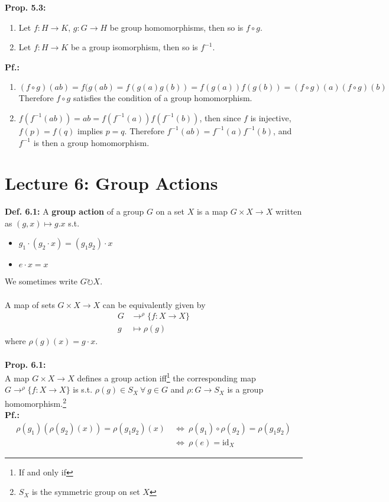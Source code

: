 \documentclass{article}
\begin{document}
\textbf{Prop. 5.3:}\\
\begin{enumerate}
\item Let $f:H\rightarrow K$, $g:G\rightarrow H$ be group homomorphisms, then so is $f\circ g$.
\item Let $f:H\rightarrow K$ be a group isomorphism, then so is $f^{-1}$.
\end{enumerate}
\textbf{Pf.:}
\begin{enumerate}
\item $ (f\circ g)(ab)=f(g(ab)=f(g(a)g(b))=f(g(a))f(g(b))=(f\circ g)(a)(f\circ g)(b)$\\
Therefore $f\circ g$ satisfies the condition of a group homomorphism.
\item $f(f^{-1}(ab))=ab=f(f^{-1}(a))f(f^{-1}(b))$, then since $f$ is injective, $f(p)=f(q)$ implies $p=q$. Therefore $f^{-1}(ab)=f^{-1}(a)f^{-1}(b)$, and $f^{-1}$ is then a group homomorphism.
\end{enumerate}
\newpage
\section{Lecture 6: Group Actions}
\textbf{Def. 6.1:}
A \textbf{group action} of a group $G$ on a set $X$ is a map $G\times X\rightarrow X$ written as $(g,x)\mapsto g.x$ s.t.
\begin{itemize}
\item $g_1\cdot (g_2\cdot x)=(g_1g_2)\cdot x$
\item $e\cdot x = x$
\end{itemize}
We sometimes write $G\circlearrowright X$.\\
\vspace{2mm}~\\
A map of sets $G\times X\rightarrow X$ can be equivalently given by
\begin{align*}
G&\rightarrow^{\rho}\lbrace f:X\rightarrow X\rbrace\\
g&\mapsto\rho(g)
\end{align*}
where $\rho(g)(x)=g\cdot x$.\\
\vspace{2mm}~\\
\textbf{Prop. 6.1:}\\
A map $G\times X\rightarrow X$ defines a group action iff\footnote{If and only if} the corresponding map $G\rightarrow^{\rho}\lbrace f:X\rightarrow X\rbrace$ is s.t. $\rho(g)\in S_X ~\forall~g\in G$ and $\rho:G\rightarrow S_X$ is a group homomorphism.\footnote{$S_X$ is the symmetric group on set $X$} \vspace{2mm}\\
\textbf{Pf.:}
\begin{align*}
\rho (g_1)(\rho(g_2)(x))=\rho(g_1g_2)(x)~&\Leftrightarrow ~\rho(g_1)\circ\rho(g_2)=\rho(g_1g_2)\\&\Leftrightarrow ~\rho(e)=\mathrm{id}_X
\end{align*}
\end{document}
